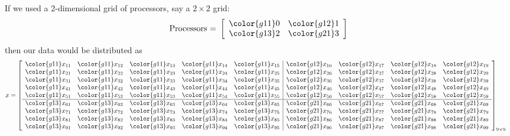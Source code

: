 If we used a 2-dimensional grid of processors, say a $2\times 2$ grid:
\begin{align*}
\text{Processors = }
\left[
      \begin{array}{ll}
      \color{g11}0 & \color{g12}1 \\ \color{g13}2 & \color{g21}3
      \end{array}
\right]
\end{align*}
then our data would be distributed as
\begin{align*}
x &= \left[
      \begin{array}{lllll|llll}
      \color{g11}x_{11} & \color{g11}x_{12} & \color{g11}x_{13} & \color{g11}x_{14} & \color{g11}x_{15} & \color{g12}x_{16} & \color{g12}x_{17} & \color{g12}x_{18} & \color{g12}x_{19}\\
      \color{g11}x_{21} & \color{g11}x_{22} & \color{g11}x_{23} & \color{g11}x_{24} & \color{g11}x_{25} & \color{g12}x_{26} & \color{g12}x_{27} & \color{g12}x_{28} & \color{g12}x_{29}\\
      \color{g11}x_{31} & \color{g11}x_{32} & \color{g11}x_{33} & \color{g11}x_{34} & \color{g11}x_{35} & \color{g12}x_{36} & \color{g12}x_{37} & \color{g12}x_{38} & \color{g12}x_{39}\\
      \color{g11}x_{41} & \color{g11}x_{42} & \color{g11}x_{43} & \color{g11}x_{44} & \color{g11}x_{45} & \color{g12}x_{46} & \color{g12}x_{47} & \color{g12}x_{48} & \color{g12}x_{49}\\
      \color{g11}x_{51} & \color{g11}x_{52} & \color{g11}x_{53} & \color{g11}x_{54} & \color{g11}x_{55} & \color{g12}x_{56} & \color{g12}x_{57} & \color{g12}x_{58} & \color{g12}x_{59}\\\hline
      \color{g13}x_{61} & \color{g13}x_{62} & \color{g13}x_{63} & \color{g13}x_{64} & \color{g13}x_{65} & \color{g21}x_{66} & \color{g21}x_{67} & \color{g21}x_{68} & \color{g21}x_{69}\\
      \color{g13}x_{71} & \color{g13}x_{72} & \color{g13}x_{73} & \color{g13}x_{74} & \color{g13}x_{75} & \color{g21}x_{76} & \color{g21}x_{77} & \color{g21}x_{78} & \color{g21}x_{79}\\
      \color{g13}x_{81} & \color{g13}x_{82} & \color{g13}x_{83} & \color{g13}x_{84} & \color{g13}x_{85} & \color{g21}x_{86} & \color{g21}x_{87} & \color{g21}x_{88} & \color{g21}x_{89}\\
      \color{g13}x_{91} & \color{g13}x_{92} & \color{g13}x_{93} & \color{g13}x_{94} & \color{g13}x_{95} & \color{g21}x_{96} & \color{g21}x_{97} & \color{g21}x_{98} & \color{g21}x_{99}\\
      \end{array}
\right]_{9\times 9}
\end{align*}




